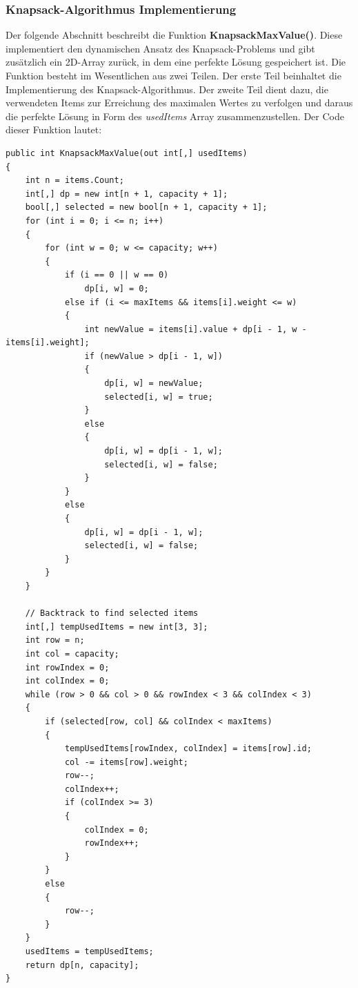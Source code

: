 \subsubsection*{Knapsack-Algorithmus Implementierung}
Der folgende Abschnitt beschreibt die Funktion \textbf{KnapsackMaxValue()}. Diese implementiert den dynamischen Ansatz
des Knapsack-Problems und gibt zusätzlich ein 2D-Array zurück, in dem eine perfekte Lösung gespeichert ist. Die Funktion
besteht im Wesentlichen aus zwei Teilen. Der erste Teil beinhaltet die Implementierung des Knapsack-Algorithmus. Der
zweite Teil dient dazu, die verwendeten Items zur Erreichung des maximalen Wertes zu verfolgen und daraus die perfekte
Lösung in Form des \textit{usedItems} Array zusammenzustellen. Der Code dieser Funktion lautet:
\begin{lstlisting}[style=csharp, caption={Knapsack Algorithmus / Item Backtracking}, label=code:startKnapsack]
public int KnapsackMaxValue(out int[,] usedItems)
{
    int n = items.Count;
    int[,] dp = new int[n + 1, capacity + 1];
    bool[,] selected = new bool[n + 1, capacity + 1];
    for (int i = 0; i <= n; i++)
    {
        for (int w = 0; w <= capacity; w++)
        {
            if (i == 0 || w == 0)
                dp[i, w] = 0;
            else if (i <= maxItems && items[i].weight <= w)
            {
                int newValue = items[i].value + dp[i - 1, w - items[i].weight];
                if (newValue > dp[i - 1, w])
                {
                    dp[i, w] = newValue;
                    selected[i, w] = true;
                }
                else
                {
                    dp[i, w] = dp[i - 1, w];
                    selected[i, w] = false;
                }
            }
            else
            {
                dp[i, w] = dp[i - 1, w];
                selected[i, w] = false;
            }
        }
    }

    // Backtrack to find selected items
    int[,] tempUsedItems = new int[3, 3];
    int row = n;
    int col = capacity;
    int rowIndex = 0;
    int colIndex = 0;
    while (row > 0 && col > 0 && rowIndex < 3 && colIndex < 3)
    {
        if (selected[row, col] && colIndex < maxItems)
        {
            tempUsedItems[rowIndex, colIndex] = items[row].id;
            col -= items[row].weight;
            row--;
            colIndex++;
            if (colIndex >= 3)
            {
                colIndex = 0;
                rowIndex++;
            }
        }
        else
        {
            row--;
        }
    }
    usedItems = tempUsedItems;
    return dp[n, capacity];
}
\end{lstlisting}
